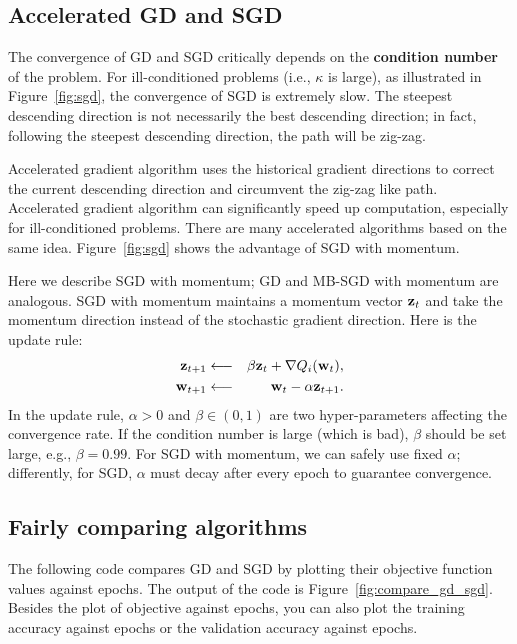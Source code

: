 \documentclass[11pt]{article}
\numberwithin{equation}{section}
\def\w{{\bf w}}
\def\z{{\bf z}}
\begin{document}
\subsection{Accelerated GD and SGD}

The convergence of GD and SGD critically depends on the {\bf condition number} of the problem.
For ill-conditioned problems (i.e., $\kappa$ is large), as illustrated in Figure~\ref{fig:sgd},
the convergence of SGD is extremely slow.
The steepest descending direction is not necessarily the best descending direction;
in fact, following the steepest descending direction, the path will be zig-zag.







Accelerated gradient algorithm uses the historical gradient directions to correct the current descending direction and circumvent the zig-zag like path.
Accelerated gradient algorithm can significantly speed up computation, especially for ill-conditioned problems.
There are many accelerated algorithms based on the same idea.
Figure~\ref{fig:sgd} shows the advantage of SGD with momentum.


Here we describe SGD with momentum; GD and MB-SGD with momentum are analogous.
SGD with momentum maintains a momentum vector $\z_t$
and take the momentum direction instead of the stochastic gradient direction.
Here is the update rule:
\begin{eqnarray*}
	\z_{t+1} & \longleftarrow & \beta \z_t + \nabla Q_i (\w_t ), \\
	\w_{t+1} & \longleftarrow & \w_t - \alpha \z_{t+1} .
\end{eqnarray*}
In the update rule,
$\alpha > 0$ and $\beta \in (0, 1)$ are two hyper-parameters affecting the convergence rate.
If the condition number is large (which is bad), $\beta$ should be set large, e.g., $\beta = 0.99$.
For SGD with momentum, we can safely use fixed $\alpha$;
differently, for SGD, $\alpha$ must decay after every epoch to guarantee convergence.







\subsection{Fairly comparing algorithms}

The following code compares GD and SGD by plotting their objective function values against epochs.
The output of the code is Figure~\ref{fig:compare_gd_sgd}.
Besides the plot of objective against epochs,
you can also plot the training accuracy against epochs or the validation accuracy against epochs.
\end{document}
